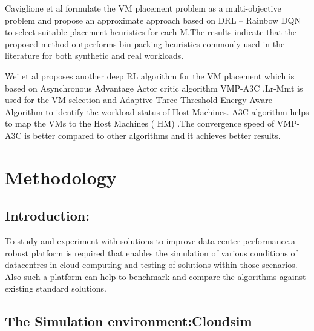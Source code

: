 \documentclass[a4paper,12pt]{Classes/RoboticsLaTeX}
\begin{document}
    Caviglione et al \cite{caviglione2021deep}formulate the VM placement problem as a multi-objective problem and propose an approximate approach based on DRL – Rainbow DQN to select suitable placement heuristics for each M.The results indicate that the proposed method outperforms bin packing heuristics commonly used in the literature for both synthetic and real workloads.
    
    Wei et al \cite{wei2023vmp}proposes another deep RL algorithm for the VM placement which is based on Asynchronous Advantage Actor critic algorithm VMP-A3C .Lr-Mmt is used for the   VM selection and Adaptive Three Threshold Energy Aware Algorithm to identify the workload status of Host Machines. A3C algorithm helps to map the VMs to the Host  Machines ( HM) .The convergence speed of VMP-A3C is better compared to other algorithms and it achieves better results.
	

	
		
	\chapter{Methodology}
	\label{chap:methodology}
 
        \section{Introduction:}
        To study and experiment with solutions to improve data center performance,a robust platform is required that enables the simulation of various conditions of datacentres in cloud computing  and testing of solutions within those scenarios. Also such a platform can help to benchmark and compare the algorithms against existing standard solutions.

        \section{The Simulation environment:Cloudsim}
\end{document}
